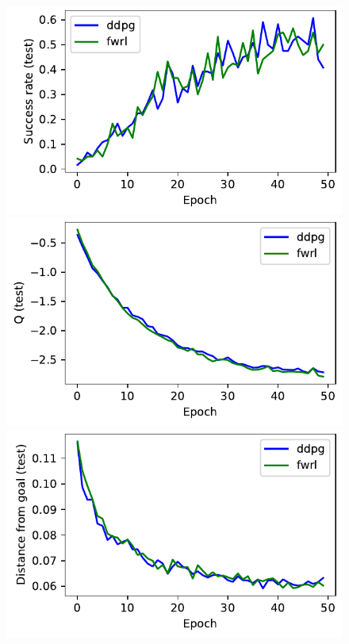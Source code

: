 %
\begin{figure}%
  \def\frac{0.25}
  \includegraphics[width=\frac\columnwidth]{media/res/3d07a6e-FetchReachPR-v1-fwrl-future/test/success_rate.pdf}%
  \includegraphics[width=\frac\columnwidth]{media/res/3d07a6e-FetchReachPR-v1-fwrl-future/test/mean_Q.pdf}%
  \includegraphics[width=\frac\columnwidth]{media/res/3d07a6e-FetchReachPR-v1-fwrl-future/test/ag_g_dist.pdf}%

\end{figure}
